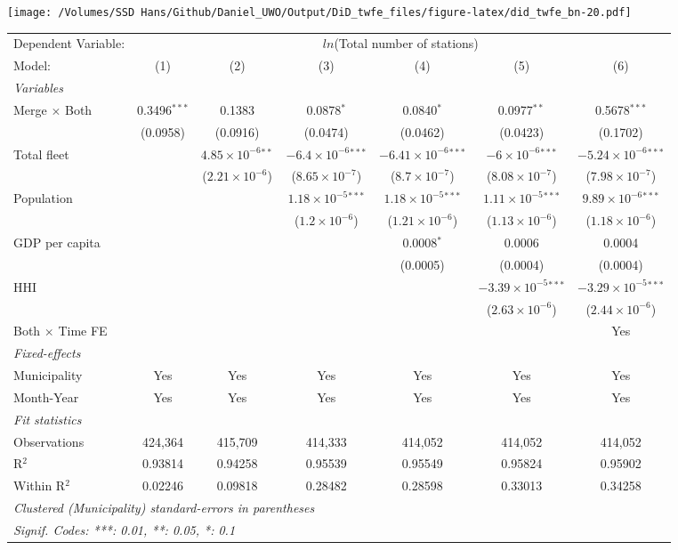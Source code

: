 \documentclass[
]{article}
\begin{document}
\texttt{[image: /Volumes/SSD Hans/Github/Daniel\_UWO/Output/DiD\_twfe\_files/figure-latex/did\_twfe\_bn-20.pdf]}

\begin{tabular}{lcccccc}
\tabularnewline\midrule\midrule
Dependent Variable:&\multicolumn{6}{c}{$ln$(Total number of stations)}\\
Model:&(1) & (2) & (3) & (4) & (5) & (6)\\
\midrule \emph{Variables}&   &   &   &   &   &  \\
Merge $\times $ Both & 0.3496$^{***}$ & 0.1383 & 0.0878$^{*}$ & 0.0840$^{*}$ & 0.0977$^{**}$ & 0.5678$^{***}$\\
  &(0.0958) & (0.0916) & (0.0474) & (0.0462) & (0.0423) & (0.1702)\\
Total fleet &    & $4.85\times 10^{-6}$$^{**}$ & $-6.4\times 10^{-6}$$^{***}$ & $-6.41\times 10^{-6}$$^{***}$ & $-6\times 10^{-6}$$^{***}$ & $-5.24\times 10^{-6}$$^{***}$\\
  &   & ($2.21\times 10^{-6}$) & ($8.65\times 10^{-7}$) & ($8.7\times 10^{-7}$) & ($8.08\times 10^{-7}$) & ($7.98\times 10^{-7}$)\\
Population &    &    & $1.18\times 10^{-5}$$^{***}$ & $1.18\times 10^{-5}$$^{***}$ & $1.11\times 10^{-5}$$^{***}$ & $9.89\times 10^{-6}$$^{***}$\\
  &   &    & ($1.2\times 10^{-6}$) & ($1.21\times 10^{-6}$) & ($1.13\times 10^{-6}$) & ($1.18\times 10^{-6}$)\\
GDP per capita &    &    &    & 0.0008$^{*}$ & 0.0006 & 0.0004\\
  &   &    &    & (0.0005) & (0.0004) & (0.0004)\\
HHI &    &    &    &    & $-3.39\times 10^{-5}$$^{***}$ & $-3.29\times 10^{-5}$$^{***}$\\
  &   &    &    &    & ($2.63\times 10^{-6}$) & ($2.44\times 10^{-6}$)\\
Both $\times$ Time FE &  &  &  &  &  & Yes\\
\midrule \emph{Fixed-effects}&   &   &   &   &   &  \\
Municipality & Yes & Yes & Yes & Yes & Yes & Yes\\
Month-Year & Yes & Yes & Yes & Yes & Yes & Yes\\
\midrule \emph{Fit statistics}&  & & & & & \\
Observations & 424,364&415,709&414,333&414,052&414,052&414,052\\
R$^2$ & 0.93814&0.94258&0.95539&0.95549&0.95824&0.95902\\
Within R$^2$ & 0.02246&0.09818&0.28482&0.28598&0.33013&0.34258\\
\midrule\midrule\multicolumn{7}{l}{\emph{Clustered (Municipality) standard-errors in parentheses}}\\
\multicolumn{7}{l}{\emph{Signif. Codes: ***: 0.01, **: 0.05, *: 0.1}}\\
\end{tabular}
\end{document}
